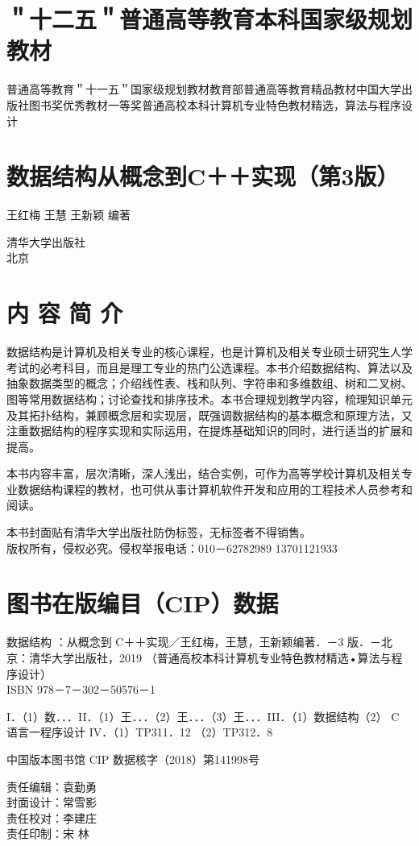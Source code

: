 \documentclass[10pt]{article}
\begin{document}
\section*{＂十二五＂普通高等教育本科国家级规划教材}
普通高等教育＂十一五＂国家级规划教材教育部普通高等教育精品教材中国大学出版社图书奖优秀教材一等奖普通高校本科计算机专业特色教材精选，算法与程序设计

\section*{数据结构从概念到C＋＋实现（第3版）}
王红梅 王慧 王新颖 编著

清华大学出版社\\
北京

\section*{内 容 简 介}
数据结构是计算机及相关专业的核心课程，也是计算机及相关专业硕士研究生人学考试的必考科目，而且是理工专业的热门公选课程。本书介绍数据结构、算法以及抽象数据类型的概念；介绍线性表、栈和队列、字符串和多维数组、树和二叉树、图等常用数据结构；讨论查找和排序技术。本书合理规划教学内容，梳理知识单元及其拓扑结构，兼顾概念层和实现层，既强调数据结构的基本概念和原理方法，又注重数据结构的程序实现和实际运用，在提炼基础知识的同时，进行适当的扩展和提高。

本书内容丰富，层次清晰，深人浅出，结合实例，可作为高等学校计算机及相关专业数据结构课程的教材，也可供从事计算机软件开发和应用的工程技术人员参考和阅读。

本书封面贴有清华大学出版社防伪标签，无标签者不得销售。\\
版权所有，侵权必究。侵权举报电话：010－62782989 13701121933

\section*{图书在版编目（CIP）数据}
数据结构 ：从概念到 C＋＋实现／王红梅，王慧，王新颖编著．－3 版．－北京：清华大学出版社，2019 （普通高校本科计算机专业特色教材精选•算法与程序设计）\\
ISBN 978－7－302－50576－1

I．（1）数．．．II．（1）王．．．（2）王．．．（3）王．．．III．（1）数据结构（2） C 语言一程序设计 IV．（1）TP311．12 （2）TP312．8

中国版本图书馆 CIP 数据核字（2018）第141998号

责任编辑：袁勤勇\\
封面设计：常雪影\\
责任校对：李建庄\\
责任印制：宋 林
\end{document}
